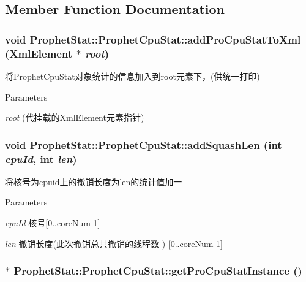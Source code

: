 \subsection{Member Function Documentation}
\hypertarget{classProphetStat_1_1ProphetCpuStat_ae57688a78d61dcbe7370fefae03ecb98}{
\subsubsection[{addProCpuStatToXml}]{\setlength{\rightskip}{0pt plus 5cm}void ProphetStat::ProphetCpuStat::addProCpuStatToXml ({\bf XmlElement} $\ast$ {\em root})}}
\label{classProphetStat_1_1ProphetCpuStat_ae57688a78d61dcbe7370fefae03ecb98}
将ProphetCpuStat对象统计的信息加入到root元素下，(供统一打印) 
\begin{DoxyParams}{Parameters}
\item[{\em root}](代挂载的XmlElement元素指针) \end{DoxyParams}
\hypertarget{classProphetStat_1_1ProphetCpuStat_a80086134fec10a5180c7c7a2c3cc2378}{
\subsubsection[{addSquashLen}]{\setlength{\rightskip}{0pt plus 5cm}void ProphetStat::ProphetCpuStat::addSquashLen (int {\em cpuId}, \/  int {\em len})}}
\label{classProphetStat_1_1ProphetCpuStat_a80086134fec10a5180c7c7a2c3cc2378}
将核号为cpuid上的撤销长度为len的统计值加一 
\begin{DoxyParams}{Parameters}
\item[{\em cpuId}]核号\mbox{[}0..coreNum-\/1\mbox{]} \item[{\em len}]撤销长度(此次撤销总共撤销的线程数 ) \mbox{[}0..coreNum-\/1\mbox{]} \end{DoxyParams}
\hypertarget{classProphetStat_1_1ProphetCpuStat_a1dfee1a62c17b8e9035b68563368702e}{
\subsubsection[{getProCpuStatInstance}]{ $\ast$ ProphetStat::ProphetCpuStat::getProCpuStatInstance ()}}
